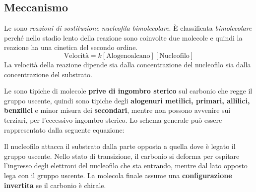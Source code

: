 
\subsection{Meccanismo \texorpdfstring{\mech[2]}{SN2}}
Le \textbf{\mech[2]} sono \textit{reazioni di sostituzione nucleofila bimolecolare}. È classificata \textit{bimolecolare} perché nello stadio lento della reazione sono coinvolte due molecole e quindi la reazione ha una cinetica del secondo ordine.
\begin{equation*}
	\text{Velocità} = k\left[\text{Alogenoalcano}\right]\left[\text{Nucleofilo}\right]
\end{equation*}
La velocità della reazione dipende sia dalla concentrazione del nucleofilo sia dalla concentrazione del substrato.

Le \mech[2] sono tipiche di molecole \textbf{prive di ingombro sterico} sul carbonio che regge il gruppo uscente, quindi sono tipiche degli \textbf{alogenuri metilici, primari, allilici, benzilici} e minor misura dei \textbf{secondari}, mentre non possono avvenire sui terziari, per l'eccessivo ingombro sterico.
Lo schema generale può essere rappresentato dalla seguente equazione:
\chemnameinit{}
\begin{reaction}
		\+
	\arrow
	\arrow
	 \+ 
\end{reaction}
\chemnameinit{}

Il nucleofilo attacca il substrato dalla parte opposta a quella dove è legato il gruppo uscente. Nello stato di transizione, il carbonio si deforma per ospitare l'ingresso degli elettroni del nucleofilo che sta entrando, mentre dal lato opposto lega con il gruppo uscente. La molecola finale assume una \textbf{configurazione invertita} se il carbonio è chirale.

